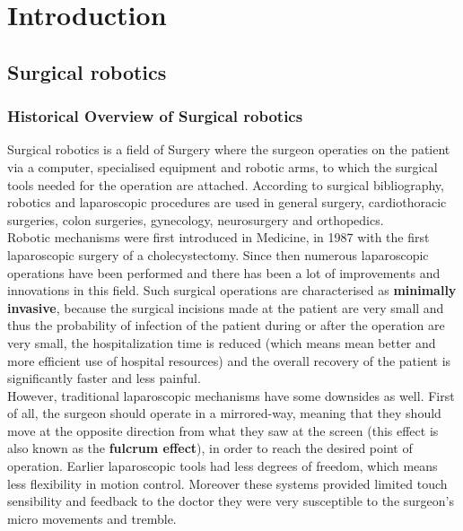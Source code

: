 \section{Introduction}

\subsection{Surgical robotics}

\subsubsection{Historical Overview of Surgical robotics}

Surgical robotics is a field of Surgery where the surgeon operaties on the patient via a computer, specialised equipment and robotic arms, 
to which the surgical tools needed for the operation are attached. According to surgical bibliography, robotics and laparoscopic procedures are used 
in general surgery, cardiothoracic surgeries, colon surgeries, gynecology, neurosurgery and orthopedics. \\

Robotic mechanisms were first introduced in Medicine, in 1987 with the first laparoscopic surgery of a cholecystectomy. Since then numerous laparoscopic 
operations have been performed and there has been a lot of improvements and innovations in this field. Such surgical operations are characterised as 
\textbf{minimally invasive}, because the surgical incisions made at the patient are very small and thus the probability of infection of the patient during 
or after the operation are very small, the hospitalization time is reduced (which means mean better and more efficient use of hospital resources) and the overall 
recovery of the patient is significantly faster and less painful. \\

However, traditional laparoscopic mechanisms have some downsides as well. First of all, the surgeon should operate in a mirrored-way, meaning that they should 
move at the opposite direction from what they saw at the screen (this effect is also known as the \textbf{fulcrum effect}), in order to reach the desired point of operation. Earlier laparoscopic tools had less 
degrees of freedom, which means less flexibility in motion control. Moreover these systems provided limited touch sensibility and feedback to the doctor they 
were very susceptible to the surgeon's micro movements and tremble. \\

